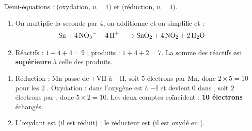 \documentclass[11pt,a4paper]{article}
\begin{document}
\begin{corrige}
Demi-équations :  (oxydation, $n=4$) et
 (réduction, $n=1$).
\begin{enumerate}[label=\alph*)]
  \item On multiplie la seconde par 4, on additionne et on simplifie  et  :
        \[\ce{Sn + 4 NO3^- + 4 H+ -> SnO2 + 4 NO2 + 2 H2O}\]
  \item Réactifs : $1+4+4=9$ ; produits : $1+4+2=7$. La somme des réactifs est \textbf{supérieure}
        à celle des produits.
\end{enumerate}
\end{corrige}

\begin{corrige}
\begin{enumerate}[label=\alph*)]
  \item Réduction : Mn passe de $+\mathrm{VII}$ à $+\mathrm{II}$, soit $5$ électrons par Mn, donc
        $2\times 5=10$ pour les 2 . Oxydation : dans  l'oxygène est à
        $-\mathrm{I}$ et devient $0$ dans , soit $2$ électrons par , donc
        $5\times 2=10$. Les deux comptes coïncident : \textbf{10 électrons} échangés.
  \item L'oxydant est  (il est réduit) ; le réducteur est  (il est oxydé en
        ).
\end{enumerate}
\end{corrige}
\end{document}
